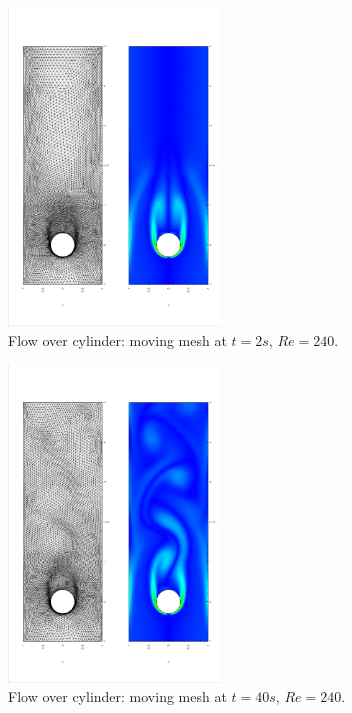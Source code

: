 \documentclass{eajam}
\begin{document}
      
      \begin{figure}[!htbp]
        \centering
        \includegraphics[width = 0.5\textwidth, angle = -90]{picture/obstacle_flow_data/mesh_vortex_t2s.eps}
        \caption{\small Flow over cylinder: moving mesh at $t = 2s$,
         $Re = 240$.}
        \label{fig::cylinder_mesh_2s}
      \end{figure}

      \begin{figure}[!htbp]
        \centering
        \includegraphics[width = 0.5\textwidth, angle = -90]{picture/obstacle_flow_data/mesh_vortex_t40s.eps}
        \caption{\small Flow over cylinder: moving mesh at $t = 40s$,
         $Re = 240$.}
        \label{fig::cylinder_mesh_40s}
      \end{figure}
\end{document}

